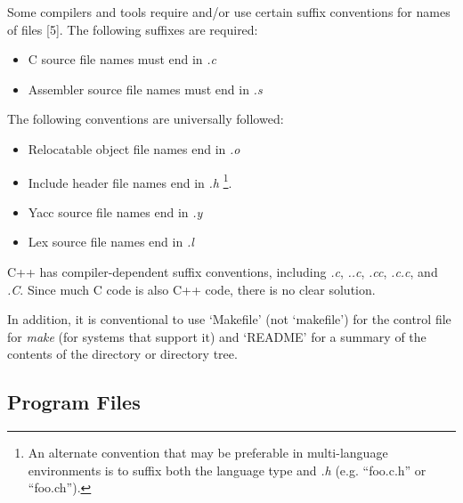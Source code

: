  Some compilers and tools require and/or use certain suffix conventions for names of
files [5]. The following suffixes are required: 
\begin{itemize}
\item C source file names must end in {\em .c}
\item Assembler source file names must end in {\em .s}
\end{itemize}
The following conventions are universally followed:
\begin{itemize}
\item Relocatable object file names end in {\em .o}
\item Include header file names end in {\em .h}
\footnote {An alternate convention that may be preferable in multi-language
environments is to suffix both the language type and {\em .h} (e.g. ``foo.c.h''
or ``foo.ch'').}.
\item Yacc source file names end in {\em .y}
\item Lex source file names end in {\em .l}
\end{itemize}
 C++ has compiler-dependent suffix conventions, including {\em .c}, {\em ..c},
{\em .cc}, {\em .c.c}, and {\em .C}. Since much C code is also C++ code, there
is no clear solution. 

 In addition, it is conventional to use `Makefile' (not `makefile') for the
control file for {\em make} (for systems that support it) and `README' for a
summary of the contents of the directory or directory tree. 

\subsection{Program Files}

